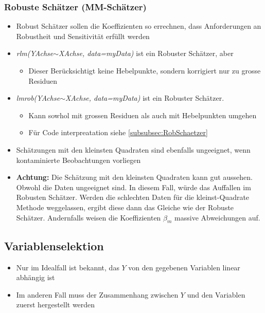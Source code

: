 \subsubsection{Robuste Schätzer (MM-Schätzer)}
\begin{itemize}
	\item Robust Schätzer sollen die Koeffizienten so errechnen, dass Anforderungen an Robustheit und Sensitivität erfüllt werden
	\item \textit{rlm(YAchse$\sim$XAchse, data=myData)} ist ein Robuster Schätzer, aber
	\begin{itemize}
		\item Dieser Berücksichtigt keine Hebelpunkte, sondern korrigiert nur zu grosse Residuen
	\end{itemize}
	\item \textit{lmrob(YAchse$\sim$XAchse, data=myData)} ist ein Robuster Schätzer. 
	\begin{itemize}
		\item Kann sowhol mit grossen Residuen als auch mit Hebelpunkten umgehen
		\item Für Code interpreatation siehe \ref{subsubsec:RobSchaetzer}
	\end{itemize}
	\item Schätzungen mit den kleinsten Quadraten sind ebenfalls ungeeignet, wenn kontaminierte Beobachtungen vorliegen
	\item \textbf{Achtung:} Die Schätzung mit den kleinsten Quadraten kann gut aussehen. Obwohl die Daten ungeeignet sind. In diesem Fall, würde das Auffallen im Robusten Schätzer. Werden die schlechten Daten für die kleinst-Quadrate Methode weggelassen, ergibt diese dann das Gleiche wie der Robuste Schätzer. Andernfalls weisen die Koeffizienten $\beta_m$ massive Abweichungen auf. 
\end{itemize}

\subsection{Variablenselektion}
\begin{itemize}
	\item Nur im Idealfall ist bekannt, das $Y$ von den gegebenen Variablen linear abhängig ist
	\item Im anderen Fall muss der Zusammenhang zwischen $Y$ und den Variablen zuerst hergestellt werden
\end{itemize}

